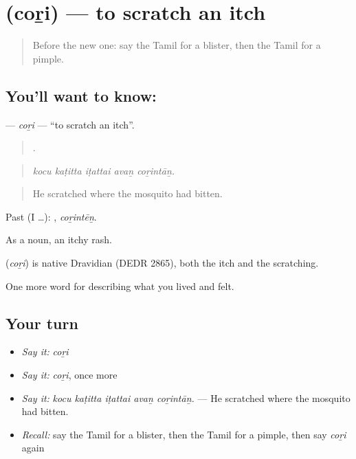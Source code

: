 \section[\texorpdfstring{\ta{சொறி} (coṟi)}{சொறி (coṟi)}]{ (coṟi) — to scratch an itch}

\label{lesson:TA-C483-cori}



\begin{quote}
Before the new one: say the Tamil for a blister, then the Tamil for a pimple.
\end{quote}

\subsection*{You'll want to know: }
\textbf{} — \emph{coṟi} — \textquotedblleft{}to scratch an itch\textquotedblright{}.

\begin{quote}
    .
\end{quote}

\begin{quote}
\emph{kocu kaṭitta iṭattai avaṉ coṟintāṉ.}
\end{quote}

\begin{quote}
He scratched where the mosquito had bitten.
\end{quote}

Past (I …): , \emph{coṟintēṉ}.

As a noun, an itchy rash.

\begin{cousinweb}
\textbf{} (\emph{coṟi}) is native Dravidian (DEDR 2865), both the itch and the scratching.
\end{cousinweb}

\begin{grammarlens}[title={What you've built}]
One more word for describing what you lived and felt.
\end{grammarlens}

\subsection*{Your turn}
\begin{itemize}
\raggedright
  \item \emph{Say it:} \emph{coṟi}
  \item \emph{Say it:} \emph{coṟi}, once more
  \item \emph{Say it:} \emph{kocu kaṭitta iṭattai avaṉ coṟintāṉ.} — He scratched where the mosquito had bitten.
  \item \emph{Recall:} say the Tamil for a blister, then the Tamil for a pimple, then say \emph{coṟi} again
\end{itemize}

